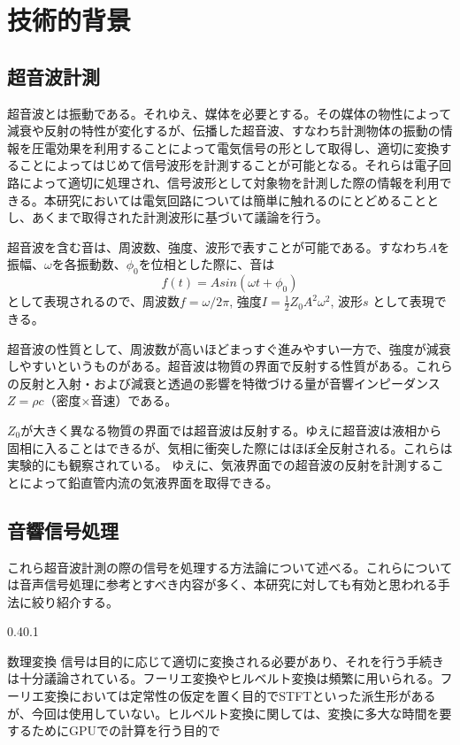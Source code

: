 \documentclass[uplatex]{suribt}
\makeatletter
\renewcommand{\subsection}{%
    \@startsection{subsection}{1}{\z@}%
    {0.4\Cvs}{0.1\Cvs}%
    {\normalfont\normalsize\headfont\raggedright}}
\makeatother
\begin{document}
\chapter{技術的背景}
\section{超音波計測}
超音波とは振動である。それゆえ、媒体を必要とする。その媒体の物性によって減衰や反射の特性が変化するが、伝播した超音波、すなわち計測物体の振動の情報を圧電効果を利用することによって電気信号の形として取得し、適切に変換することによってはじめて信号波形を計測することが可能となる。それらは電子回路によって適切に処理され、信号波形として対象物を計測した際の情報を利用できる。本研究においては電気回路については簡単に触れるのにとどめることとし、あくまで取得された計測波形に基づいて議論を行う。

超音波を含む音は、周波数、強度、波形で表すことが可能である。すなわち$A$を振幅、$\omega$を各振動数、$\phi_0$を位相とした際に、音は 
\begin{equation}
    f(t)=Asin(\omega t +\phi_0)
\end{equation}
として表現されるので、周波数$f=\omega /2\pi$, 強度$I=\frac{1}{2}Z_0 A^2 \omega^2$, 波形$s$
として表現できる。  

超音波の性質として、周波数が高いほどまっすぐ進みやすい一方で、強度が減衰しやすいというものがある。超音波は物質の界面で反射する性質がある。これらの反射と入射・および減衰と透過の影響を特徴づける量が音響インピーダンス$Z = \rho c$（密度×音速）である。

$Z_0$が大きく異なる物質の界面では超音波は反射する。ゆえに超音波は液相から固相に入ることはできるが、気相に衝突した際にはほぼ全反射される。これらは実験的にも観察されている。
ゆえに、気液界面での超音波の反射を計測することによって鉛直管内流の気液界面を取得できる。

\section{音響信号処理}
これら超音波計測の際の信号を処理する方法論について述べる。これらについては音声信号処理に参考とすべき内容が多く、本研究に対しても有効と思われる手法に絞り紹介する。


\subsection{数理変換}
信号は目的に応じて適切に変換される必要があり、それを行う手続きは十分議論されている。フーリエ変換やヒルベルト変換は頻繁に用いられる。フーリエ変換においては定常性の仮定を置く目的でSTFTといった派生形があるが、今回は使用していない。ヒルベルト変換に関しては、変換に多大な時間を要するためにGPUでの計算を行う目的で
\end{document}
